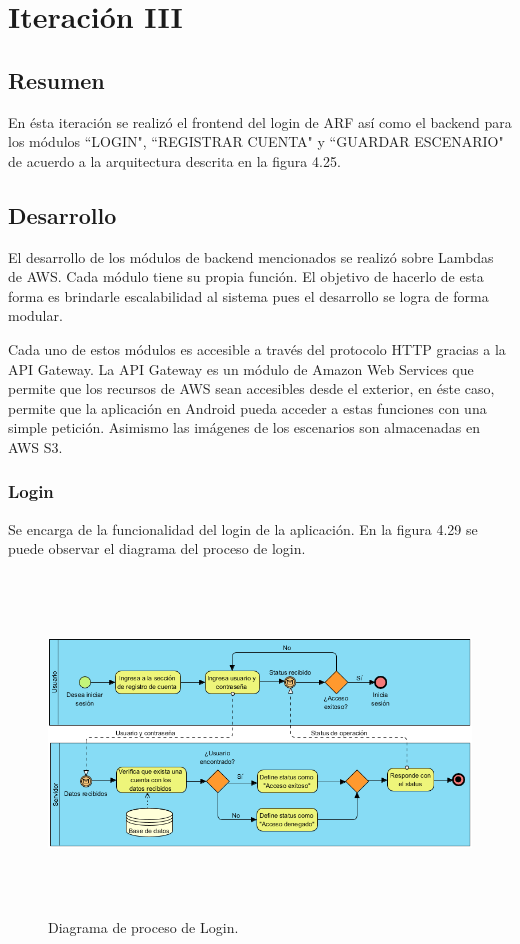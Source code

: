 \section{Iteración III}
\subsection{Resumen}
En ésta iteración se realizó el frontend del login de ARF así como el backend para los módulos ``LOGIN", ``REGISTRAR CUENTA" y ``GUARDAR ESCENARIO" de acuerdo a la arquitectura descrita en la figura 4.25. \par

\subsection{Desarrollo}
El desarrollo de los módulos de backend mencionados se realizó sobre Lambdas de AWS. Cada módulo tiene su propia función. El objetivo de hacerlo de esta forma es brindarle escalabilidad al sistema pues el desarrollo se logra de forma modular.\par
Cada uno de estos módulos es accesible a través del protocolo HTTP gracias a la API Gateway. La API Gateway es un módulo de Amazon Web Services que permite que los recursos de AWS sean accesibles desde el exterior, en éste caso, permite que la aplicación en Android pueda acceder a estas funciones con una simple petición. Asimismo las imágenes de los escenarios son almacenadas en AWS S3.\par

\subsubsection{Login}
Se encarga de la funcionalidad del login de la aplicación. En la figura 4.29 se puede observar el diagrama del proceso de login.\par
\begin{figure}[h!]
	\centering
	\includegraphics[width=15cm,height=9cm]{imagenes/desarrollo/diagramas/BPMN_LOGIN.png}
	\caption{Diagrama de proceso de Login.}
	\label{fig:loginsuccess}
\end{figure}

